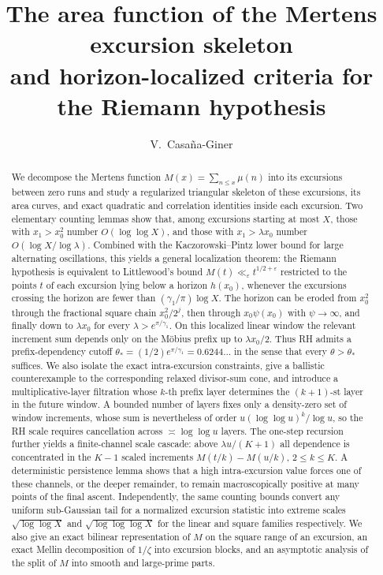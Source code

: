 \documentclass[11pt]{amsart}
\title[The Mertens excursion skeleton]{The area function of the Mertens excursion skeleton\\
and horizon-localized criteria for the Riemann hypothesis}
\author{V.~Casa\~na-Giner}
\date{}
\numberwithin{equation}{section}
\theoremstyle{plain}
\theoremstyle{definition}
\theoremstyle{remark}
\newcommand{\eps}{\varepsilon}
\begin{document}
\begin{abstract}
We decompose the Mertens function $M(x)=\sum_{n\le x}\mu(n)$ into its
excursions between zero runs and study a regularized triangular skeleton of
these excursions, its area curves, and exact quadratic and correlation
identities inside each excursion. Two elementary counting lemmas show that,
among excursions starting at most $X$, those with $x_1>x_0^2$ number
$O(\log\log X)$, and those with $x_1>\lambda x_0$ number
$O(\log X/\log\lambda)$. Combined with the Kaczorowski--Pintz lower bound for
large alternating oscillations, this yields a general localization theorem:
the Riemann hypothesis is equivalent to Littlewood's bound
$M(t)\ll_\eps t^{1/2+\eps}$ restricted to the points $t$ of each excursion
lying below a horizon $h(x_0)$, whenever the excursions crossing the horizon
are fewer than $(\gamma_1/\pi)\log X$. The horizon can be eroded from $x_0^2$ through the fractional square
chain $x_0^2/2^j$, then through $x_0\psi(x_0)$ with $\psi\to\infty$, and
finally down to $\lambda x_0$ for every
$\lambda>e^{\pi/\gamma_1}$. On this localized linear window the relevant
increment sum depends only on the M\"obius prefix up to $\lambda x_0/2$.
Thus RH admits a prefix-dependency cutoff
$\theta_*=(1/2)e^{\pi/\gamma_1}=0.6244\ldots$ in the sense that every
$\theta>\theta_*$ suffices. We also isolate the exact intra-excursion
constraints, give a ballistic counterexample to the corresponding relaxed
divisor-sum cone, and introduce a multiplicative-layer filtration whose
$k$-th prefix layer determines the $(k+1)$-st layer in the future window.  A bounded number of layers fixes only a density-zero set of window
increments, whose sum is nevertheless of order $u(\log\log u)^k/\log u$, so
the RH scale requires cancellation across $\asymp\log\log u$ layers.  The one-step
recursion further yields a finite-channel scale cascade: above
$\lambda u/(K+1)$ all dependence is concentrated in the $K-1$ scaled
increments $M(t/k)-M(u/k)$, $2\le k\le K$.  A deterministic persistence
lemma shows that a high intra-excursion value forces one of these channels,
or the deeper remainder, to remain macroscopically positive at many points
of the final ascent. Independently, the same
counting bounds convert any uniform sub-Gaussian tail for a normalized
excursion statistic into extreme scales $\sqrt{\log\log X}$ and
$\sqrt{\log\log\log X}$ for the linear and square families respectively. We
also give an exact bilinear representation of $M$ on the square range of an
excursion, an exact Mellin decomposition of $1/\zeta$ into excursion blocks,
and an asymptotic analysis of the split of $M$ into smooth and large-prime
parts.
\end{abstract}
\end{document}
